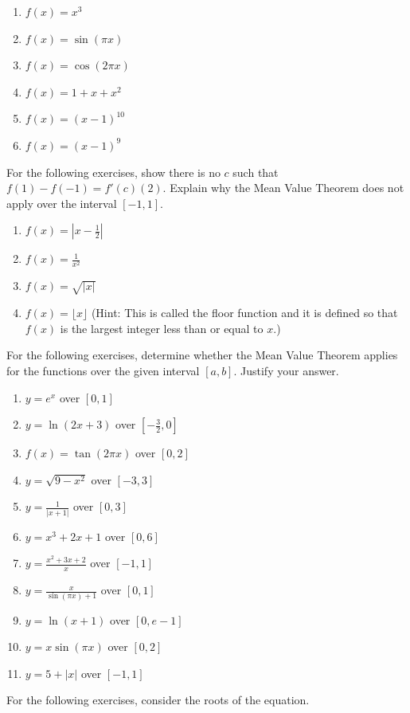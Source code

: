 \documentclass{exercises}
\begin{document}
\begin{enumerate}[resume]
\item $f(x)=x^{3}$
\item $f(x)=\sin(\pi x)$
\item $f(x)=\cos(2\pi x)$
\item $f(x)=1+x+x^{2}$
\item $f(x)=(x-1)^{10}$
\item $f(x)=(x-1)^{9}$
\end{enumerate}

For the following exercises, show there is no $c$ such that $f(1)-f(-1)=f'(c)(2)$. Explain why the Mean Value Theorem does not apply over the interval $[-1,1]$.

\begin{enumerate}[resume]
\item $f(x)=|x-\frac{1}{2}|$
\item $f(x)=\frac{1}{x^{2}}$
\item $f(x)=\sqrt{|x|}$
\item $f(x)=\lfloor x\rfloor$ (Hint: This is called the floor function and it is defined so that $f(x)$ is the largest integer less than or equal to $x$.)
\end{enumerate}

For the following exercises, determine whether the Mean Value Theorem applies for the functions over the given interval $[a,b]$. Justify your answer.

\begin{enumerate}[resume]
\item $y=e^{x}$ over $[0,1]$
\item $y=\ln(2x+3)$ over $[-\frac{3}{2},0]$
\item $f(x)=\tan(2\pi x)$ over $[0,2]$
\item $y=\sqrt{9-x^{2}}$ over $[-3,3]$
\item $y=\frac{1}{|x+1|}$ over $[0,3]$
\item $y=x^{3}+2x+1$ over $[0,6]$
\item $y=\frac{x^{2}+3x+2}{x}$ over $[-1,1]$
\item $y=\frac{x}{\sin(\pi x)+1}$ over $[0,1]$
\item $y=\ln(x+1)$ over $[0,e-1]$
\item $y=x\sin(\pi x)$ over $[0,2]$
\item $y=5+|x|$ over $[-1,1]$
\end{enumerate}

For the following exercises, consider the roots of the equation.
\end{document}
